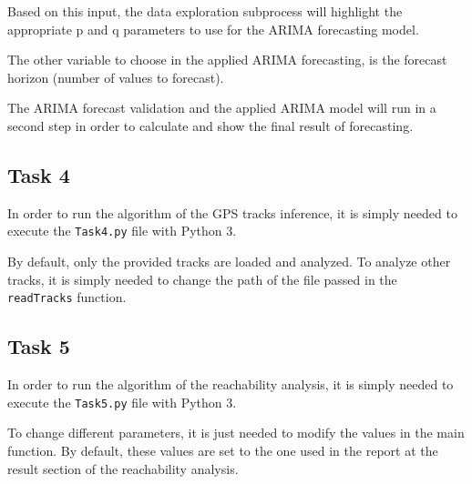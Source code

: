 \documentclass{article}
\begin{document}
Based on this input, the data exploration subprocess will highlight the appropriate p and q parameters to use for the ARIMA forecasting model.

The other variable to choose in the applied ARIMA forecasting, is the forecast horizon (number of values to forecast).

The ARIMA forecast validation and the applied ARIMA model will run in a second step in order to calculate and show the final result of forecasting.



\subsection{Task 4}

In order to run the algorithm of the GPS tracks inference, it is simply needed to execute the \texttt{Task4.py} file with Python 3.

By default, only the provided tracks are loaded and analyzed. To analyze other tracks, it is simply needed to change the path of the file passed in the \texttt{readTracks} function.


\subsection{Task 5}

In order to run the algorithm of the reachability analysis, it is simply needed to execute the \texttt{Task5.py} file with Python 3.

To change different parameters, it is just needed to modify the values in the main function. By default, these values are set to the one used in the report at the result section of the reachability analysis.
\end{document}

